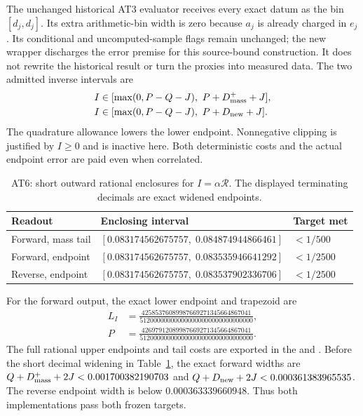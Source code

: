 The unchanged historical AT3 evaluator receives every exact datum as the bin
$[d_j,d_j]$. Its extra arithmetic-bin width is zero because $a_j$ is already
charged in $e_j$. Its conditional and uncomputed-sample flags remain unchanged;
the new wrapper discharges the error premise for this source-bound construction.
It does not rewrite the historical result or turn the proxies into measured
data. The two admitted inverse intervals are
\begin{align}
 I&\in[\max(0,P-Q-J),\ P+D_{\rm mass}^++J],
 \label{eq:primary-inverse}\\
 I&\in[\max(0,P-Q-J),\ P+D_{\rm new}+J].
 \label{eq:secondary-inverse}
\end{align}
The quadrature allowance lowers the lower endpoint. Nonnegative clipping is
justified by $I\ge0$ and is inactive here. Both deterministic costs and the
actual endpoint error are paid even when correlated.

\begin{table}[htbp]
\centering\small
\caption{AT6: short outward rational enclosures for $I=\alpha\mathcal R$.
The displayed terminating decimals are exact widened endpoints.}
\label{tab:inverse}
\begin{tabular}{lll}
\toprule
Readout & Enclosing interval & Target met\\
\midrule
Forward, mass tail & $[0.083174562675757,\;0.084874944866461]$ & $<1/500$\\
Forward, endpoint & $[0.083174562675757,\;0.083535946641292]$ & $<1/2500$\\
Reverse, endpoint & $[0.083174562675757,\;0.083537902336706]$ & $<1/2500$\\
\bottomrule
\end{tabular}
\end{table}

For the forward output, the exact lower endpoint and trapezoid are
\begin{align}
 L_I&=\frac{42585376089987669271345664867041}
 {512000000000000000000000000000000},\\
 P&=\frac{42697912089987669271345664867041}
 {512000000000000000000000000000000}.
\end{align}
The full rational upper endpoints and tail costs are exported in the
and .
Before the short decimal widening in Table~\ref{tab:inverse}, the exact forward
widths are $Q+D_{\rm mass}^++2J<0.001700382190703$ and
$Q+D_{\rm new}+2J<0.000361383965535$. The reverse endpoint width is below
$0.000363339660948$. Thus both implementations pass both frozen targets.

